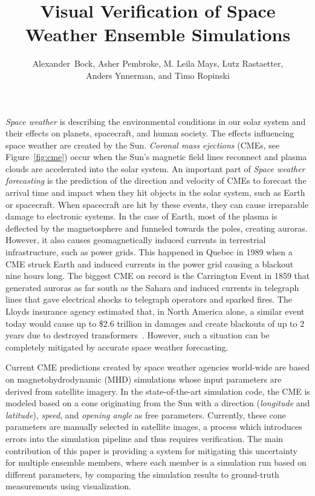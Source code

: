 \documentclass[journal]{vgtc}                %
\title{Visual Verification of Space Weather Ensemble Simulations}
\author{
    Alexander~Bock,
    Asher Pembroke,
    M. Leila Mays,
    Lutz Rastaetter,\\%
    Anders Ynnerman,
    and Timo Ropinski%
}
\begin{document}
\maketitle
\emph{Space weather} is describing the environmental conditions in our solar system and their effects on planets, spacecraft, and human society. The effects influencing space weather are created by the Sun. \emph{Coronal mass ejections} (CMEs, see Figure~\ref{fig:cme}) occur when the Sun's magnetic field lines reconnect and plasma clouds are accelerated into the solar system. An important part of \emph{Space weather forecasting} is the prediction of the direction and velocity of CMEs to forecast the arrival time and impact when they hit objects in the solar system, such as Earth or spacecraft. When spacecraft are hit by these events, they can cause irreparable damage to electronic systems. In the case of Earth, most of the plasma is deflected by the magnetosphere and funneled towards the poles, creating auroras. However, it also causes geomagnetically induced currents in terrestrial infrastructure, such as power grids. This happened in Quebec in 1989 when a CME struck Earth and induced currents in the power grid causing a blackout nine hours long. The biggest CME on record is the Carrington Event in 1859 that generated auroras as far south as the Sahara and induced currents in telegraph lines that gave electrical shocks to telegraph operators and sparked fires. The Lloyds insurance agency estimated that, in North America alone, a similar event today would cause up to \$2.6 trillion in damages and create blackouts of up to 2 years due to destroyed transformers~\cite{lloyds2013impact}. However, such a situation can be completely mitigated by accurate space weather forecasting.

Current CME predictions created by space weather agencies world-wide are based on magnetohydrodynamic (MHD) simulations whose input parameters are derived from satellite imagery. In the state-of-the-art simulation code, the CME is modeled based on a cone originating from the Sun with a direction (\emph{longitude} and \emph{latitude}), \emph{speed}, and \emph{opening angle} as free parameters. Currently, these cone parameters are manually selected in satellite images, a process which introduces errors into the simulation pipeline and thus requires verification. The main contribution of this paper is providing a system for mitigating this uncertainty for multiple ensemble members, where each member is a simulation run based on different parameters, by comparing the simulation results to ground-truth measurements using visualization.
\end{document}
